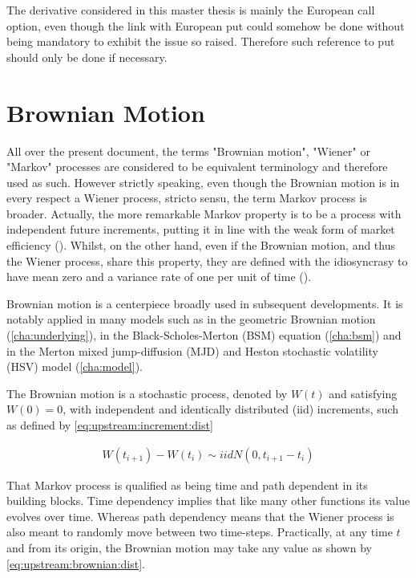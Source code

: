 \documentclass[12pt]{report}
\newcommand{\Bm}{W\left(t\right)}
\begin{document}
The derivative considered in this master thesis is mainly the European call option, even though the link with European put could somehow be done without being mandatory to exhibit the issue so raised. Therefore such reference to put should only be done if necessary.

\section{Brownian Motion}
\label{sec:upstream:brownian}
 
All over the present document, the terms "Brownian motion", "Wiener" or "Markov" processes are considered to be equivalent terminology and therefore used as such. However strictly speaking, even though the Brownian motion is in every respect a Wiener process, stricto sensu, the term Markov process is broader. 
Actually, the more remarkable Markov property is to be a process with independent future increments, putting it in line with the weak form of market efficiency (\citet{hull}).
Whilst, on the other hand, even if the Brownian motion, and thus the Wiener process, share this property, they are defined with the idiosyncrasy to have mean zero and a variance rate of one per unit of time (\citet{hull}).

Brownian motion is a centerpiece broadly used in subsequent developments. It is notably applied in many models such as in the geometric Brownian motion (\cref{cha:underlying}),  in the Black-Scholes-Merton (BSM) equation (\cref{cha:bsm}) and in the Merton mixed jump-diffusion (MJD) and Heston stochastic volatility (HSV) model (\cref{cha:model}).

The Brownian motion is a stochastic process, denoted by $\Bm$ and satisfying $W(0) = 0$, with independent and identically distributed (iid) increments, such as defined by \cref{eq:upstream:increment:dist}

\begin{align}
W(t_{i+1}) - W(t_i) \sim
  iid N \left(0, t_{i+1} - t_i\right) \label{eq:upstream:increment:dist}
\end{align}

That Markov process is qualified as being time and path dependent in its building blocks. Time dependency implies that like many other functions its value evolves over time. 
Whereas path dependency means that the Wiener process is also meant to randomly move between two time-steps.
Practically, at any time $t$ and from its origin, the Brownian motion may take any value as shown by \cref{eq:upstream:brownian:dist}.
\end{document}
